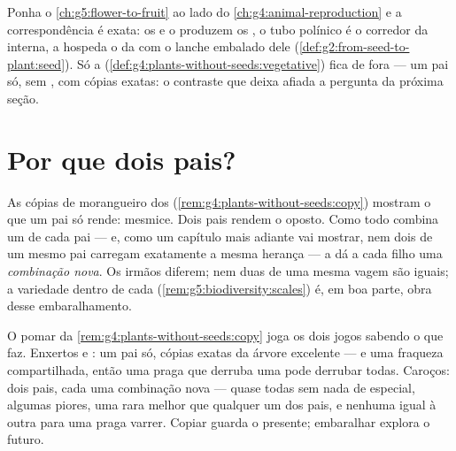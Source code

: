 \begin{remark}\label{rem:g8:sexual-reproduction:plants}
Ponha o \cref{ch:g5:flower-to-fruit} ao lado do
\cref{ch:g4:animal-reproduction} e a correspondência é exata: os
 e o  produzem os , o tubo polínico é o corredor
da  interna, a  hospeda o  da  com o
lanche embalado dele
(\cref{def:g2:from-seed-to-plant:seed}). Só a 
(\cref{def:g4:plants-without-seeds:vegetative}) fica de fora --- um pai
só, sem , com cópias exatas: o contraste que deixa afiada a
pergunta da próxima seção.
\end{remark}

\section{Por que dois pais?}

\begin{proposition}\label{prop:g8:sexual-reproduction:shuffle}
As cópias de morangueiro dos 
(\cref{rem:g4:plants-without-seeds:copy}) mostram o que um pai só
rende: mesmice. Dois pais rendem o oposto. Como todo  combina um
 de cada pai --- e, como um capítulo mais adiante vai mostrar,
nem dois  de um mesmo pai carregam exatamente a mesma herança
--- a  dá a cada filho uma \emph{combinação nova}. Os
irmãos diferem; nem duas  de uma mesma vagem são iguais; a
variedade dentro de cada 
(\cref{rem:g5:biodiversity:scales}) é, em boa parte, obra desse
embaralhamento.
\end{proposition}
\admitted

\begin{example}\label{ex:g8:sexual-reproduction:bets}
O pomar da \cref{rem:g4:plants-without-seeds:copy} joga os dois jogos
sabendo o que faz. Enxertos e : um pai só, cópias exatas da
árvore excelente --- e uma fraqueza compartilhada, então uma praga que
derruba uma pode derrubar todas. Caroços: dois pais, cada  uma
combinação nova --- quase todas sem nada de especial, algumas piores,
uma rara melhor que qualquer um dos pais, e nenhuma igual à outra para
uma praga varrer. Copiar guarda o presente; embaralhar explora o
futuro.
\end{example}

